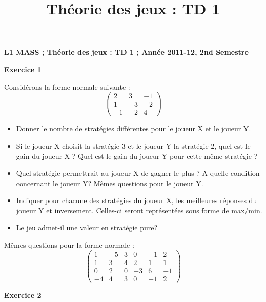 \documentclass[12pt]{article}
\title{Th\'eorie des jeux : TD 1}
\date{}
\begin{document}
\pagestyle{empty}

\textbf{L1 MASS ;   Th\'eorie des jeux : TD 1    ;      Ann\'ee 2011-12, 2nd Semestre}
\medskip

\begin{center}
\textbf{Exercice 1}\\
\end{center}

\medskip
Consid\'erons la forme normale suivante :
\begin{equation*}
\begin{pmatrix}
2&3&-1\\
1&-3&-2\\
-1&-2&4
\end{pmatrix}
\end{equation*}

\begin{itemize}
\item Donner le nombre de strat\'egies diff\'erentes pour le joueur X et le joueur Y.
\item Si le joueur X choisit la strat\'egie 3 et le joueur Y la strat\'egie 2, quel est le gain du joueur X ? Quel est le gain du joueur Y pour cette m\^eme strat\'egie ?
\item Quel strat\'egie permettrait au joueur X de gagner le plus ? A quelle condition concernant le joueur Y? M\^emes questions pour le joueur Y.
\item Indiquer pour chacune des strat\'egies du joueur X, les meilleures r\'eponses du joueur Y et inversement. Celles-ci seront repr\'esent\'ees sous forme de max/min.
\item Le jeu admet-il une valeur en strat\'egie pure? 
\end{itemize}
\medskip
M\^emes questions pour la forme normale :
\begin{equation*}
\begin{pmatrix}
1&-5&3&0&-1&2\\
1&3&4&2&1&1\\
0&2&0&-3&6&-1\\
-4&4&3&0&-1&2
\end{pmatrix}
\end{equation*}
\medskip
\medskip

\begin{center}
\textbf{Exercice 2}\\
\end{center}
\end{document}
